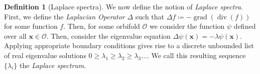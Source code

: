 \documentclass{article}[12pt]
\theoremstyle{definition}
\newtheorem*{definition}{Definition}
\DeclareMathOperator{\divergence}{div}
\DeclareMathOperator{\grad}{grad}
\begin{document}

%



\begin{definition}[Laplace spectra]
We now define the notion of \emph{Laplace spectra}. First, we define the
\emph{Laplacian Operator} $\Delta$ such that $\Delta f \coloneqq
-\grad(\divergence(f))$ for some function $f$. Then, for some orbifold
$\mathcal{O}$ we consider the function $\psi$ defined over all
$\mathbf{x} \in \mathcal{O}$. Then, consider the eigenvalue equation
$\Delta \psi(\mathbf{x}) =  -\lambda \psi(\mathbf{x})$. Applying
appropriate boundary conditions gives rise to a discrete unbounded list of
real eigenvalue solutions $0 \geq \lambda_1 \geq \lambda_2 \geq \lambda_3
\dots$. We call this resulting sequence $\{\lambda_i\}$ the \emph{Laplace
spectrum}.
\end{definition}
\end{document}
